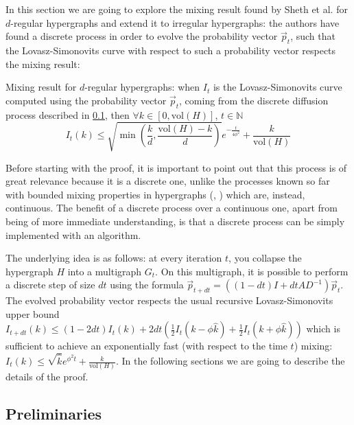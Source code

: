 \documentclass[../main.tex]{subfiles}
\begin{document}
In this section we are going to explore the mixing result found by Sheth et al. for $d$-regular hypergraphs and extend it to irregular hypergraphs: the authors have found a discrete process in order to evolve the probability vector $\vec{p}_t$, such that the Lovasz-Simonovits curve with respect to such a probability vector respects the mixing result:

\begin{theorem}
\label{theorem:mixing_theorem_regular_hypergraphs}
    Mixing result for $d$-regular hypergraphs: when $I_t$ is the Lovasz-Simonovits curve computed using the probability vector $\vec{p}_t$, coming from the discrete diffusion process described in \ref{subsubsec:preliminaries}, then $\forall k \in [0, \text{vol}(H)]$, $t\in \mathbb{N}$
    \begin{equation}
        I_t(k) \leq \sqrt{\min\left(\frac{k}{d}, \frac{\text{vol}(H) - k}{d} \right)} e^{-\frac{t}{4 \phi^2}} + \frac{k}{\text{vol}(H)}
    \end{equation}
\end{theorem}

Before starting with the proof, it is important to point out that this process is of great relevance because it is a discrete one, unlike the processes known so far with bounded mixing properties in hypergraphs (\cite{Takai_2020}, \cite{continuous_laplacian_hypergraph}) which are, instead, continuous. The benefit of a discrete process over a continuous one, apart from being of more immediate understanding, is that a discrete process can be simply implemented with an algorithm. 

The underlying idea is as follows: at every iteration $t$, you collapse the hypergraph $H$ into a multigraph $G_t$. On this multigraph, it is possible to perform a discrete step of size $dt$ using the formula $\vec{p}_{t+dt} = ((1-dt)I+dtAD^{-1})\vec{p}_t$. The evolved probability vector respects the usual recursive Lovasz-Simonovits upper bound $I_{t+dt}(k) \leq (1-2dt) I_t(k) + 2dt(\frac{1}{2}I_t(k-\phi \hat{k}) + \frac{1}{2}I_t(k+\phi \hat{k}))$ which is sufficient to achieve an exponentially fast (with respect to the time $t$) mixing: $I_t(k) \leq \sqrt{\hat{k}}e^{\phi^2 t} + \frac{k}{\text{vol}(H)}$.
In the following sections we are going to describe the details of the proof.

\subsection{Preliminaries}
\label{subsubsec:preliminaries}
\end{document}
